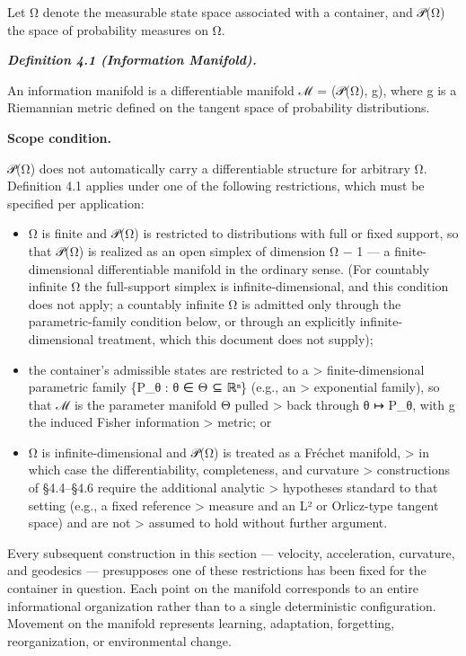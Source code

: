 \documentclass[
]{article}
\begin{document}
Let Ω denote the measurable state space associated with a container, and
𝒫(Ω) the space of probability measures on Ω.

\emph{\textbf{Definition 4.1 (Information Manifold).}}

An information manifold is a differentiable manifold ℳ = (𝒫(Ω), g),
where g is a Riemannian metric defined on the tangent space of
probability distributions.

\textbf{Scope condition.}

𝒫(Ω) does not automatically carry a differentiable structure for
arbitrary Ω. Definition 4.1 applies under one of the following
restrictions, which must be specified per application:

\begin{itemize}
\item
  Ω is finite and 𝒫(Ω) is restricted to distributions with full or
  fixed support, so that 𝒫(Ω) is realized as an open simplex of
  dimension \textbar{}Ω\textbar{} − 1 --- a finite-dimensional
  differentiable manifold in the ordinary sense. (For countably infinite
  Ω the full-support simplex is infinite-dimensional, and this condition
  does not apply; a countably infinite Ω is admitted only through the
  parametric-family condition below, or through an explicitly
  infinite-dimensional treatment, which this document does not
  supply);
\item
  the container's admissible states are restricted to a \textgreater{}
  finite-dimensional parametric family \{P\_θ : θ ∈ Θ ⊆ ℝⁿ\} (e.g., an
  \textgreater{} exponential family), so that ℳ is the parameter
  manifold Θ pulled \textgreater{} back through θ ↦ P\_θ, with g the
  induced Fisher information \textgreater{} metric; or
\item
  Ω is infinite-dimensional and 𝒫(Ω) is treated as a Fréchet manifold,
  \textgreater{} in which case the differentiability, completeness, and
  curvature \textgreater{} constructions of §4.4--§4.6 require the
  additional analytic \textgreater{} hypotheses standard to that setting
  (e.g., a fixed reference \textgreater{} measure and an L² or
  Orlicz-type tangent space) and are not \textgreater{} assumed to hold
  without further argument.
\end{itemize}

Every subsequent construction in this section --- velocity,
acceleration, curvature, and geodesics --- presupposes one of these
restrictions has been fixed for the container in question. Each point on
the manifold corresponds to an entire informational organization rather
than to a single deterministic configuration. Movement on the manifold
represents learning, adaptation, forgetting, reorganization, or
environmental change.
\end{document}
